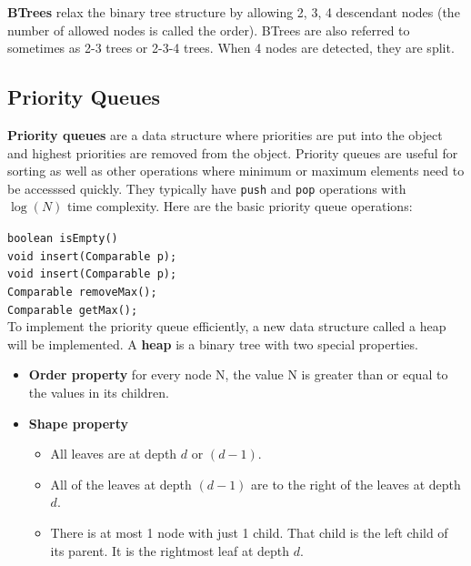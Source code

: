 \textbf{BTrees} relax the binary tree structure by allowing 2, 3, 4 descendant nodes (the number of allowed nodes is called the order). BTrees are also referred to sometimes as 2-3 trees or 2-3-4 trees. When 4 nodes are detected, they are split. 

\subsection{Priority Queues}

\textbf{Priority queues} are a data structure where priorities are put into the object and highest priorities are removed from the object. Priority queues are useful for sorting as well as other operations where minimum or maximum elements need to be accesssed quickly. They typically have \texttt{push} and \texttt{pop} operations with $\log(N)$ time complexity. Here are the basic priority queue operations:

\indent \indent \texttt{boolean isEmpty()} \\
\indent \indent \texttt{void insert(Comparable p);} \\
\indent \indent \texttt{void insert(Comparable p);} \\
\indent \indent \texttt{Comparable removeMax();} \\
\indent \indent \texttt{Comparable getMax();} \\

To implement the priority queue efficiently, a new data structure called a heap will be implemented. A \textbf{heap} is a binary tree with two special properties.

\begin{itemize}
	\item \textbf{Order property} for every node N, the value N is greater than or equal to the values in its children. 
	\item \textbf{Shape property} 
	\begin{itemize}
		\item All leaves are at depth $d$ or $(d-1)$.
		\item All of the leaves at depth $(d-1)$ are to the right of the leaves at depth $d$.
		\item There is at most 1 node with just 1 child. That child is the left child of its parent. It is the rightmost leaf at depth $d$. 
	\end{itemize}
\end{itemize}

